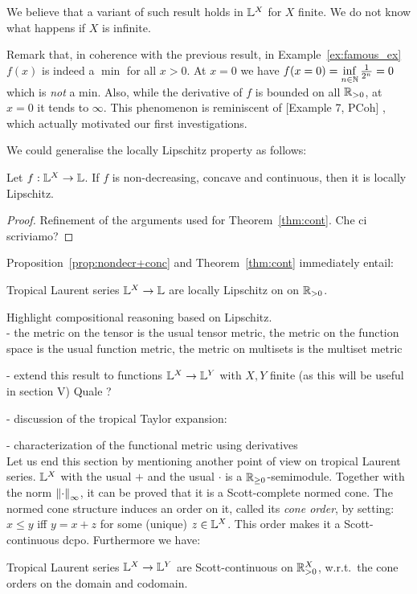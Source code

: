 We believe that a variant of such result holds in $\mathbb{L}^X$ for $X$ finite.
We do not know what happens if $X$ is infinite.

Remark that, in coherence with the previous result, in Example~\ref{ex:famous_ex} $f(x)$ is indeed a $\min$ for all $x>0$.
At $x=0$ we have $f(x=0)=\inf\limits_{n\in\mathbb{N}} \frac{1}{2^n}=0$ which is \emph{not} a min.
Also, while the derivative of $f$ is bounded on all $\mathbb{R}_{>0}$, at $x=0$ it tends to $\infty$.
This phenomenon is reminiscent of [Example 7, PCoh]
, which actually motivated our first investigations.

We could generalise the locally Lipschitz property as follows:
\begin{theorem}
 Let $f:\mathbb{L}^X\to\mathbb{L}$.
 If $f$ is non-decreasing, concave and continuous, then it is locally Lipschitz.
\end{theorem}
\begin{proof}
 Refinement of the arguments used for Theorem~\ref{thm:cont}.
 {\color{red}Che ci scriviamo?}
\end{proof}

Proposition~\ref{prop:nondecr+conc} and Theorem~\ref{thm:cont} immediately entail:
\begin{corollary}\label{cor:TLSlocLip}
 Tropical Laurent series $\mathbb{L}^X\to\mathbb{L}$ are locally Lipschitz on on $\mathbb{R}_{>0}$.
\end{corollary}

Highlight compositional reasoning based on Lipschitz.\\

- the metric on the tensor is the usual tensor metric, the metric on the function space is the usual function metric, the metric on multisets is the multiset metric

{\color{red}
- extend this result to functions $\mathbb{L}^{X}\to \mathbb{L}^{Y}$ with $X,Y$ finite (as this will be useful in section V) Quale ?} 



- discussion of the tropical Taylor expansion: 


- characterization of the functional metric using derivatives\\

Let us end this section by mentioning another point of view on tropical Laurent series.
$\mathbb{L}^X$ with the usual $+$ and the usual $\cdot$ is a $\mathbb{R}_{\geq0}$-semimodule.
Together with the norm $\left\lVert\cdot\right\rVert_\infty$, it can be proved that it is a Scott-complete normed cone.
The normed cone structure induces an order on it, called its \emph{cone order}, by setting:
$x\leq y$ iff $y=x+z$ for some (unique) $z\in\mathbb{L}^X$.
This order makes it a Scott-continuous dcpo.
Furthermore we have:

\begin{proposition}
  Tropical Laurent series $\mathbb{L}^X\to\mathbb{L}^Y$ are Scott-continuous on $\mathbb{R}_{>0}^X$, w.r.t.\ the cone orders on the domain and codomain.
\end{proposition}
